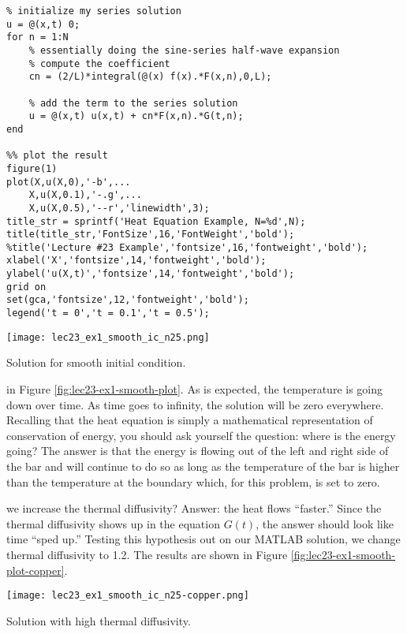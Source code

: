 \begin{lstlisting}[name=lec23_ex1, style=myMatlab]
%% Compute the solution
% initialize my series solution
u = @(x,t) 0;
for n = 1:N
    % essentially doing the sine-series half-wave expansion
    % compute the coefficient
    cn = (2/L)*integral(@(x) f(x).*F(x,n),0,L);
    
    % add the term to the series solution
    u = @(x,t) u(x,t) + cn*F(x,n).*G(t,n);
end

%% plot the result
figure(1)
plot(X,u(X,0),'-b',...
    X,u(X,0.1),'-.g',...
    X,u(X,0.5),'--r','linewidth',3);
title_str = sprintf('Heat Equation Example, N=%d',N);
title(title_str,'FontSize',16,'FontWeight','bold');
%title('Lecture #23 Example','fontsize',16,'fontweight','bold');
xlabel('X','fontsize',14,'fontweight','bold');
ylabel('u(X,t)','fontsize',14,'fontweight','bold');
grid on
set(gca,'fontsize',12,'fontweight','bold');
legend('t = 0','t = 0.1','t = 0.5');
\end{lstlisting}
\begin{marginfigure}
\texttt{[image: lec23\_ex1\_smooth\_ic\_n25.png]}
\caption{Solution for smooth initial condition.}
\label{fig:lec23-ex1-smooth-plot}
\end{marginfigure}
 in Figure \ref{fig:lec23-ex1-smooth-plot}. As is expected, the temperature is going down over time. As time goes to infinity, the solution will be zero everywhere.  Recalling that the heat equation is simply a mathematical representation of conservation of energy, you should ask yourself the question: where is the energy going?  The answer is that the energy is flowing out of the left and right side of the bar and will continue to do so as long as the temperature of the bar is higher than the temperature at the boundary which, for this problem, is set to zero.

 we increase the thermal diffusivity?  Answer: the heat flows ``faster.''  Since the thermal diffusivity shows up in the equation $G(t)$, the answer should look like time ``sped up.''  Testing this hypothesis out on our MATLAB solution, we change thermal diffusivity to 1.2.  The results are shown in Figure \ref{fig:lec23-ex1-smooth-plot-copper}.
\begin{marginfigure}
\texttt{[image: lec23\_ex1\_smooth\_ic\_n25-copper.png]}
\caption{Solution with high thermal diffusivity.}
\label{fig:lec23-ex1-smooth-plot-copper}
\end{marginfigure}

